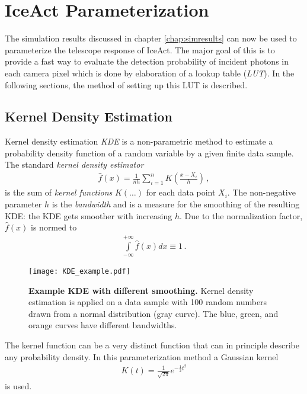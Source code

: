 \chapter{IceAct Parameterization}

The simulation results discussed in chapter \ref{chap:simresults} can now be used to parameterize the telescope response of IceAct. The major goal of this is to provide a fast way to evaluate the detection probability of incident photons in each camera pixel which is done by elaboration of a lookup table (\textit{LUT}). In the following sections, the method of setting up this LUT is described.

\section{Kernel Density Estimation}

Kernel density estimation \textit{KDE} is a non-parametric method to estimate a probability density function of a random variable by a given finite data sample. The standard \textit{kernel density estimator}
\begin{align}
	\hat{f}(x)=\frac{1}{nh}\sum_{i=1}^{n}K\left(\frac{x-X_i}{h}\right)\,,
	\label{eq:kde}
\end{align}
is the sum of \textit{kernel functions} $K(\dots)$ for each data point $X_i$. The non-negative parameter $h$ is the \textit{bandwidth} and is a measure for the smoothing of the resulting KDE: the KDE gets smoother with increasing $h$. Due to the normalization factor, $\hat{f}(x)$ is normed to
\begin{align}
	\int\limits_{-\infty}^{+\infty}\hat{f}(x)dx \equiv 1\,.
\end{align}

\begin{figure}[h]
	\centering
	\texttt{[image: KDE\_example.pdf]}
	\caption[Example KDE with different smoothing]{\textbf{Example KDE with different smoothing.} \cite{kde:example_plot} Kernel density estimation is applied on a data sample with 100 random numbers drawn from a normal distribution (gray curve). The blue, green, and orange curves have different bandwidths.}
	\label{kde:example_1d}	
\end{figure}

The kernel function can be a very distinct function that can in principle describe any probability density. In this parameterization method a Gaussian kernel
\begin{align}
	K(t) = \frac{1}{\sqrt{2\pi}}e^{-\frac{1}{2}t^2}
\end{align}
is used.

